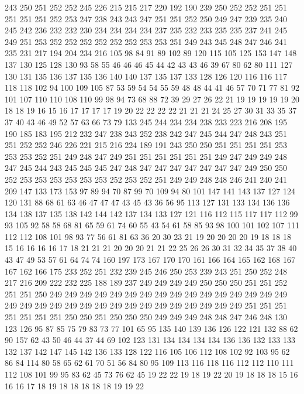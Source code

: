 243 250 251 252 252 245 226 215 215 217 220 192 190 239 250 252 252 251 251 251
251 251 252 253 247 238 243 243 247 251 251 252 250 249 247 239 235 240 245 242
236 232 232 230 234 234 234 234 237 235 232 233 235 235 237 241 245 249 251 253
252 252 252 252 252 252 253 253 251 249 243 245 248 247 246 241 235 231 217 194
204 234 216 105 98 84 91 89 102 89 120 115 105 125 153 147 148 137 130 125
128 130 93 58 55 46 46 46 45 44 42 43 43 46 39 67 80 62 80 111
127 130 131 135 136 137 135 136 140 140 137 135 137 133 128 126 120 116 116 117
118 118 102 94 100 109 105 87 53 59 54 54 55 59 48 48 44 41 46 57
70 71 77 81 92 101 107 110 110 108 110 99 98 94 73 68 88 72 39 29
27 26 22 21 19 19 19 19 19 20 18 18 19 16 15 16 17 17 17 17
19 20 22 22 22 22 21 21 21 24 25 27 30 31 33 35 37 37 40 43
46 49 52 57 63 66 73 79 133 245 244 234 234 238 233 223 216 208 195 190
185 183 195 212 232 247 238 243 252 238 242 247 245 244 247 248 243 251 251 252
252 246 226 221 215 216 224 189 191 243 250 250 251 251 251 251 253 253 253 252
251 249 248 247 249 251 251 251 251 251 251 249 247 249 249 248 247 245 244 243
245 245 245 247 248 247 247 247 247 247 247 247 249 250 250 252 253 253 253 253
253 253 252 253 252 251 249 249 248 248 246 241 240 241 209 147 133 173 153 97
89 94 70 87 99 70 109 94 80 101 147 141 143 137 127 124 120 131 88 68
61 63 46 47 47 47 43 45 43 36 56 95 113 127 131 133 134 136 136 134
138 137 135 138 142 144 142 137 134 133 127 121 116 112 115 117 117 112 99 93
105 92 58 58 68 81 65 59 61 74 60 55 43 54 61 58 85 93 98 100
101 102 107 111 112 112 108 101 98 93 77 56 61 81 63 36 20 30 23 21
19 20 20 20 20 19 18 18 18 15 16 16 16 16 17 18 21 21 21 20
20 20 21 21 22 25 26 26 30 31 32 34 35 37 38 40 43 47 49 53
57 61 64 74 74 160 197 173 167 170 170 161 166 164 165 162 168 167 167 162
166 175 233 252 251 232 239 245 246 250 253 239 243 251 250 252 248 217 216 209
222 232 225 188 189 237 249 249 249 249 250 250 250 251 251 252 251 251 250 249
249 249 249 249 249 249 249 249 249 249 249 249 249 249 249 249 249 249 249 249
249 249 249 249 249 249 249 249 249 249 249 251 251 251 251 251 251 251 250 250
251 250 250 250 249 249 249 248 248 247 246 248 130 123 126 95 87 85 75 79
83 73 77 101 65 95 135 140 139 136 126 122 121 132 88 62 90 157 62 43
50 46 44 37 44 69 102 123 131 134 134 134 134 136 136 132 133 133 132 137
142 147 145 142 136 133 128 122 116 105 106 112 108 102 92 103 95 62 86 84
114 80 58 65 62 61 70 51 56 84 80 95 109 113 116 118 116 112 112 110
111 112 108 101 99 95 83 62 45 73 76 62 45 19 22 22 19 18 19 22
20 19 18 18 18 15 16 16 16 17 18 19 18 18 18 18 18 19 19 22
